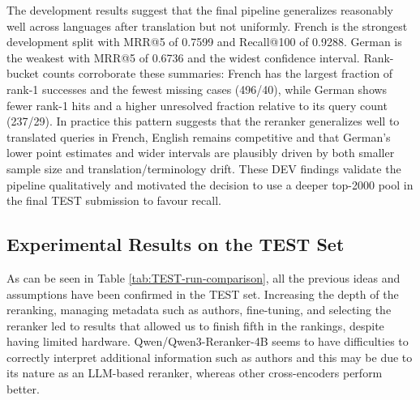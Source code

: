 The development results suggest that the final pipeline generalizes reasonably well across languages after translation but not uniformly. French is the strongest development split with MRR@5 of 0.7599 and Recall@100 of 0.9288. German is the weakest with MRR@5 of 0.6736 and the widest confidence interval.
Rank-bucket counts corroborate these summaries: French has the largest fraction of rank-1 successes and the fewest missing cases (496/40), while German shows fewer rank-1 hits and a higher unresolved fraction relative to its query count (237/29).
In practice this pattern suggests that the reranker generalizes well to translated queries in French, English remains competitive and that German's lower point estimates and wider intervals are plausibly driven by both smaller sample size and translation/terminology drift. These DEV findings validate the pipeline qualitatively and motivated the decision to use a deeper top-2000 pool in the final TEST submission to favour recall.

\subsection{Experimental Results on the TEST Set}
As can be seen in Table \ref{tab:TEST-run-comparison}, all the previous ideas and assumptions have been confirmed in the TEST set. Increasing the depth of the reranking, managing metadata such as authors, fine-tuning, and selecting the reranker led to results that allowed us to finish fifth in the rankings, despite having limited hardware. Qwen/Qwen3-Reranker-4B seems to have difficulties to correctly interpret additional information such as authors and this may be due to its nature as an LLM-based reranker, whereas other cross-encoders perform better.

